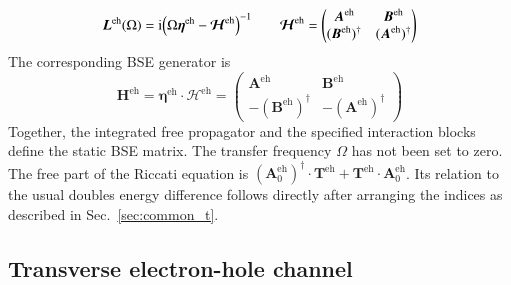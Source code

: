 \documentclass[aip,jcp,reprint,noshowkeys,superscriptaddress]{revtex4-1}
\newcommand{\eh}{\text{eh}}
\newcommand{\ii}{\mathrm{i}}
\newcommand{\bT}{\boldsymbol{T}}
\newcommand{\bA}{\boldsymbol{A}}
\newcommand{\bB}{\boldsymbol{B}}
\newcommand{\bH}{\boldsymbol{H}}
\newcommand{\bL}{\boldsymbol{L}}
\newcommand{\bEta}{\boldsymbol{\eta}}
\newcommand{\bcalH}{\boldsymbol{\mathcal{H}}}
\begin{document}
\begin{equation}
    \bL^{\eh}(\Omega)
    =
    \ii
    \qty(
        \Omega\bEta^{\eh}-\bcalH^{\eh}
    )^{-1}
    \qquad
    \bcalH^{\eh}
    =
    \begin{pmatrix}
        \bA^{\eh}&\bB^{\eh}\\
        (\bB^{\eh})^{\dagger}&(\bA^{\eh})^{\dagger}
    \end{pmatrix}
    \label{eq:L_eh_resolvent}
\end{equation}
The corresponding BSE generator is
\begin{equation}
    \bH^{\eh}
    =
    \bEta^{\eh}\cdot\bcalH^{\eh}
    =
    \begin{pmatrix}
        \bA^{\eh}&\bB^{\eh}\\
        -(\bB^{\eh})^{\dagger}&-(\bA^{\eh})^{\dagger}
    \end{pmatrix}
    \label{eq:H_eh_from_frequency}
\end{equation}
Together, the integrated free propagator and the specified interaction
blocks define the static BSE matrix. The transfer frequency $\Omega$ has
not been set to zero.
The free part of the Riccati equation is
$(\bA_0^{\eh})^{\dagger}\cdot\bT^{\eh}
+\bT^{\eh}\cdot \bA_0^{\eh}$. Its relation to the usual doubles energy
difference follows directly after arranging the indices as described in
Sec.~\ref{sec:common_t}.

\subsection{Transverse electron-hole channel}
\end{document}

